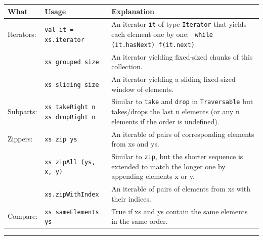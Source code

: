 \documentclass[article, a5paper]{memoir}
\newcommand{\LangColor}{red}
\newcommand{\head}[1]{{\bfseries {\color{\LangColor}{#1}}\par\vspace{1mm}\hrule\vspace{-2mm}}}
\renewcommand{\arraystretch}{0.9}
\newcommand{\Newline}{\vspace{\baselineskip}}
\begin{document}
{\small\renewcommand{\arraystretch}{1.1}
\begin{tabular}{@{}l p{3.4cm} p{6.8cm}}

\textbf{What} & \textbf{Usage} & \textbf{Explanation} \\ \hline

  Iterators: & \texttt{val it = xs.iterator} & An iterator \texttt{it} of type \texttt{Iterator} that yields each element one by one: \texttt{ while (it.hasNext) f(it.next)}\\   \cline{2-3}

   & \texttt{xs grouped size} & An iterator yielding fixed-sized chunks of this collection.\\\cline{2-3}
   & \texttt{xs sliding size} & An iterator yielding a sliding fixed-sized window of elements.\\\cline{1-3}

  Subparts: & \texttt{xs takeRight n \newline xs dropRight n} & Similar to \texttt{take} and \texttt{drop} in \texttt{Traversable} but takes/drops the last n elements (or any n elements if the order is undefined).\\   \cline{1-3}

  Zippers: & \texttt{xs zip ys} &  	An iterable of pairs of corresponding elements from xs and ys.\\   \cline{2-3}
   & \texttt{xs zipAll (ys, x, y)} & Similar to \texttt{zip}, but the shorter sequence is extended to match the longer one by appending elements x or y.\\\cline{2-3}
   & \texttt{xs.zipWithIndex} & An iterable of pairs of elements from xs with their indices.\\\cline{1-3}

  Compare: & \texttt{xs sameElements ys} & True if xs and ys contain the same elements in the same order.\\   \cline{1-3}

        
\end{tabular}
}  

\Newline
\head{Methods in trait \texttt{Seq[A]}}\Newline
\end{document}
